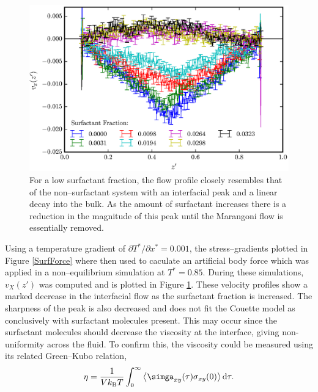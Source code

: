\begin{figure}[h]
\centering
\includegraphics[scale=0.8]{SurfFlow}
\caption{For a low surfactant fraction, the flow profile closely resembles that of the non--surfactant system with an interfacial peak and a linear decay into the bulk.
As the amount of surfactant increases there is a reduction in the magnitude of this peak until the Marangoni flow is essentially removed.
}
\label{SurfFlow}
\end{figure}
Using a temperature gradient of $\partial T^{*} / \partial x^{*} = 0.001$, the stress--gradients plotted in Figure \ref{SurfForce} where then used to caculate an artificial body force which was applied in a non--equilibrium simulation at $T^{*}=0.85$.
During these simulations, $v_{X}(z')$ was computed and is plotted in Figure \ref{SurfFlow}.
These velocity profiles show a marked decrease in the interfacial flow as the surfactant fraction is increased.
The sharpness of the peak is also decreased and does not fit the Couette model as conclusively with surfactant molecules present.
This may occur since the surfactant molecules should decrease the viscosity at the interface, giving non-uniformity across the fluid. 
To confirm this, the viscosity could be measured using its related Green--Kubo relation,
\begin{equation}
\eta = \frac{1}{V k_{\mathrm{B}} T} \int_{0}^{\infty} \left< \simga_{xy}(\tau) \sigma_{xy}(0) \right> \mathrm{d} \tau.
\end{equation}

